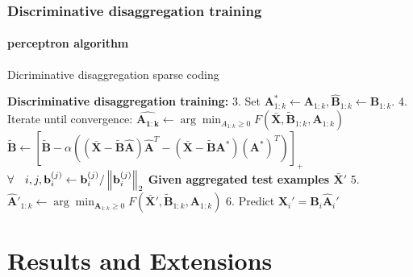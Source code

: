 \documentclass{beamer}              %
\begin{document}
\begin{frame}
\frametitle{Discriminative disaggregation training}
\framesubtitle{perceptron algorithm}
\begin{algorithm}[H]
\caption{Dicriminative disaggregation sparse coding}
\label{alg:DDSC}
\begin{algorithmic}[1]
\Statex \textbf{Discriminative disaggregation training:}
\Statex  \hspace{0.2in} 3. Set $\mathbf{A}_{1:k}^* \leftarrow \mathbf{A}_{1:k},\hat{\mathbf{B}}_{1:k} \leftarrow \mathbf{B}_{1:k}.$
\Statex  \hspace{0.2in} 4. Iterate until convergence:
\Statex \hspace{0.4in} $\hat{\mathbf{A_{1:k}}} \leftarrow \arg \! \min_{A_{1:k} \geq 0} F\left( \bar{\mathbf{X}},\tilde{\mathbf{B}}_{1:k},\mathbf{A}_{1:k} \right)$
\Statex \hspace{0.4in} $\tilde{\mathbf{B}} \leftarrow \left[ \tilde{\mathbf{B}} - \alpha \left( (\bar{\mathbf{X}} - \tilde{\mathbf{B}}\hat{\mathbf{A}})\hat{\mathbf{A}}^T - (\bar{\mathbf{X}}-\tilde{\mathbf{B}}\mathbf{A}^*)(\mathbf{A}^*)^T \right) \right]_+$
\Statex \hspace{0.4in} $\forall \quad i,j,\mathbf{b}_i^{(j)} \leftarrow \mathbf{b}_i^{(j)} / \left\lVert\mathbf{b}_i^{(j)}\right\rVert_2$
\Statex \textbf{Given aggregated test examples $\bar{\mathbf{X}}'$}
\Statex \hspace{0.2in} 5. $\hat{\mathbf{A}}'_{1:k} \leftarrow \arg \! \min_{\mathbf{A}_{1:k} \geq 0} F(\bar{\mathbf{X}}',\tilde{\mathbf{B}}_{1:k},\mathbf{A}_{1:k})$
\Statex \hspace{0.2in} 6. Predict $\hat{\mathbf{X}}_i' = \mathbf{B}_i\hat{\mathbf{A}}_i'$
\end{algorithmic}
\end{algorithm}
\end{frame}




\section{Results and Extensions}
\end{document}

